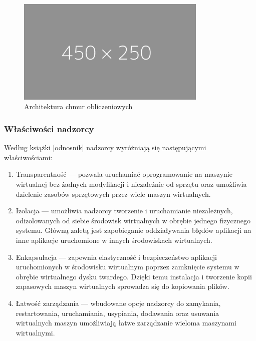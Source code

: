 \documentclass[12pt]{report}
\let\Oldsubsubsection\subsubsection
\renewcommand{\subsubsection}{\FloatBarrier\Oldsubsubsection}
\begin{document}
\begin{figure}[h]
	\centering
	\includegraphics[width=0.81\textwidth]{images/placeholder-wide.png}
	\caption{Architektura chmur obliczeniowych}
\end{figure}

\subsubsection{Właściwości nadzorcy}
Według książki [odnosnik] nadzorcy wyróżniają się następującymi właściwościami:
\begin{enumerate}
\item Transparentność --- pozwala uruchamiać oprogramowanie na maszynie wirtualnej bez żadnych modyfikacji i niezależnie od sprzętu oraz umożliwia dzielenie zasobów sprzętowych przez wiele maszyn wirtualnych.
\item Izolacja --- umożliwia nadzorcy tworzenie i uruchamianie niezależnych, odizolowanych od siebie środowisk wirtualnych w obrębie jednego fizycznego systemu. Główną zaletą jest zapobieganie oddziaływania błędów aplikacji na inne aplikacje uruchomione w innych środowiskach wirtualnych.
\item Enkapsulacja --- zapewnia elastyczność i bezpieczeństwo aplikacji uruchomionych w środowisku wirtualnym poprzez zamknięcie systemu w obrębie wirtualnego dysku twardego. Dzięki temu instalacja i tworzenie kopii zapasowych maszyn wirtualnych sprowadza się do kopiowania plików.
\item Łatwość zarządzania --- wbudowane opcje nadzorcy do zamykania, restartowania, uruchamiania, usypiania, dodawania oraz usuwania wirtualnych maszyn umożliwiają łatwe zarządzanie wieloma maszynami wirtualnymi.
\end{enumerate}
\end{document}
